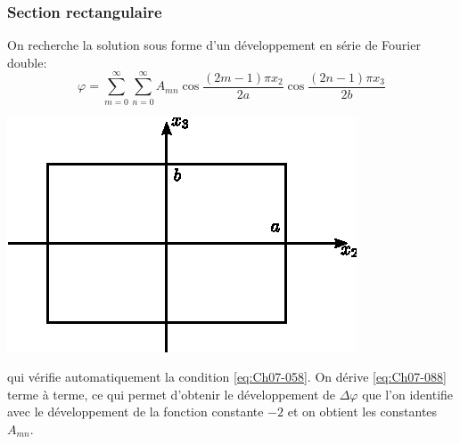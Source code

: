 \subsubsection{Section rectangulaire}
On recherche la solution sous forme d'un développement en série de Fourier double: 
\begin{equation}
    \varphi = \sum_{m=0}^{\infty} \sum_{n=0}^{\infty} A_{mn} \cos \frac{(2m-1)\pi x_2}{2a} \cos \frac{(2n-1)\pi x_3}{2b}
    \label{eq:Ch07-088}
\end{equation}
\begin{center}
    \includegraphics{../images/T1_Ch07-17}
\end{center}
qui vérifie automatiquement la condition \eqref{eq:Ch07-058}.
On dérive \eqref{eq:Ch07-088} terme à terme, ce qui permet  d'obtenir le développement de $\Delta\varphi$ que l'on identifie  avec le développement de la fonction constante $-2$ et  on  obtient les  constantes $A_{mn}$.

